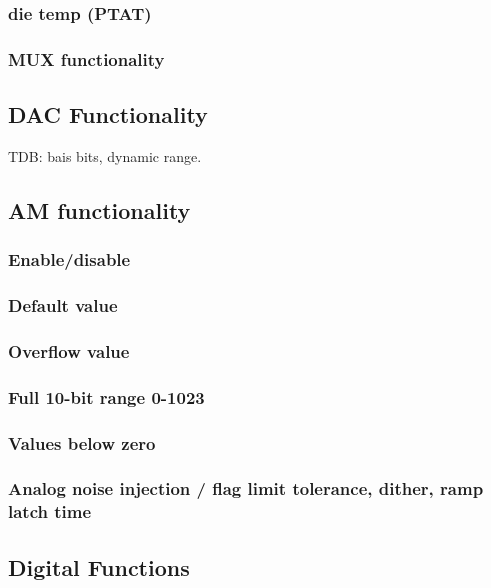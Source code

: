 \documentclass[11pt]{article}   			%
\begin{document}
\subsubsection{die temp (PTAT)}

\subsubsection{MUX functionality}

\subsection{DAC Functionality}
TDB: bais bits, dynamic range.

\subsection{AM functionality}

\subsubsection{Enable/disable}

\subsubsection{Default value}

\subsubsection{Overflow value}

\subsubsection{Full 10-bit range 0-1023}

\subsubsection{Values below zero}

\subsubsection{Analog noise injection / flag limit tolerance, dither, ramp latch time}

\subsection{Digital Functions}
\end{document}
